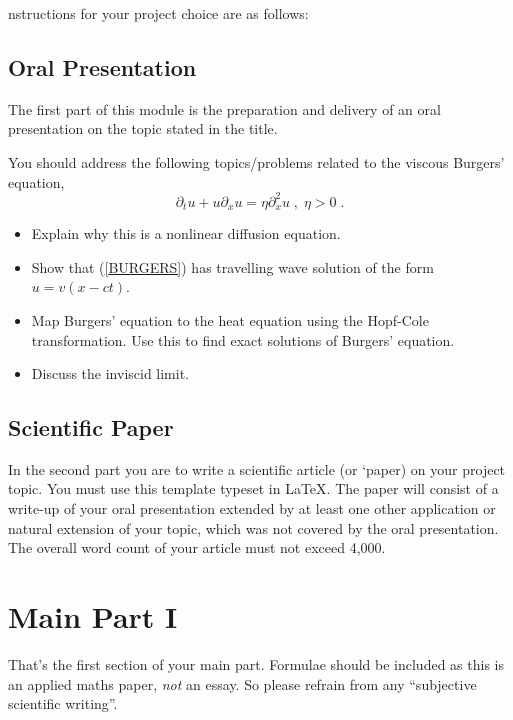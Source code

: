 \documentclass[reprint,amsmath,amssymb,floatfix,biblatex]{revtex4-2}
\newcommand{\bl}[1]{\color{blue}{#1}}
\begin{document}
{\bl Instructions for your project choice are as follows:

\subsection{Oral Presentation}

The first part of this module is the preparation and delivery of an oral presentation on the topic stated in the title. 

You should address the following topics/problems related to the viscous Burgers' equation,
%
\begin{equation} \label{BURGERS}
 \partial_t u + u \partial_x u = \eta \partial_x^2 u \; , \; \eta > 0 \; .
\end{equation}
%

\begin{itemize}
\item Explain why this is a nonlinear diffusion equation. 
\item Show that (\ref{BURGERS}) has travelling wave solution of the form $u = v(x-ct)$.  
\item Map Burgers' equation to the heat equation using the Hopf-Cole transformation. Use this to find exact solutions of Burgers' equation.
\item Discuss the inviscid limit.  
\end{itemize}


\subsection{Scientific Paper}

In the second part you are to write a scientific article (or `paper) on your project topic. You must use this template typeset in \LaTeX. The paper will consist of a write-up of your oral presentation extended by at least one other application or natural extension of your topic, which was not covered by the oral presentation. The overall word count of your article must not exceed 4,000.}  

\section{Main Part I}

That's the first section of your main part. Formulae should be included as this is an applied maths paper, \textit{not} an essay. So please refrain from any ``subjective scientific writing''.  
\end{document}
